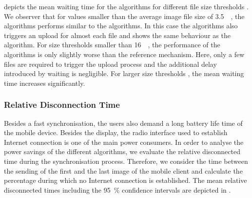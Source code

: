  depicts the mean waiting time \sojournTime for the \algosize algorithms for different file size thresholds \thresholdSize.
We observer that for values smaller than the average image file size of \SI{3.5}{\mega\byte}, the \algosize algorithms performs similar to the \algoimmediate algorithms.
In this case the \algosize algorithms also triggers an upload for almost each file and shows the same behaviour as the \algoimmediate algorithm.
For size thresholds \thresholdSize smaller than \SI{16}{\mega\byte}, the performance of the \algosize algorithms is only slightly worse than the reference mechanism.
Here, only a few files are required to trigger the upload process and the additional delay introduced by waiting is negligible.
For larger size thresholds \thresholdSize, the mean waiting time \sojournTime increases significantly.

\subsubsection*{Relative Disconnection Time}\label{sec:application:cloud_file_synchronisation:numerical_evaluation:relative_disconnection_time}

Besides a fast synchronisation, the users also demand a long battery life time of the mobile device.
Besides the display, the radio interface used to establish Internet connection is one of the main power consumers.
In order to analyse the power savings of the different algorithms, we evaluate the relative disconnected time  \relativeDisconnectedTime during the synchronisation process.
Therefore, we consider the time between the sending of the first and the last image of the mobile client and calculate the percentage during which no Internet connection is established.
The mean relative disconnected times including the \SI{95}{\percent} confidence intervals are depicted in . 

